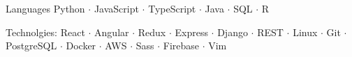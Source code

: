 


\begin{cvskills}

\cvskill
  {Languages } %
  {Python $\cdot$ JavaScript $\cdot$ TypeScript $\cdot$ Java $\cdot$ SQL $\cdot$ R } %




\cvskill
  {Technolgies:} %
  {React $\cdot$ Angular $\cdot$ Redux $\cdot$ Express $\cdot$ Django $\cdot$ REST $\cdot$ Linux $\cdot$ Git $\cdot$ PostgreSQL $\cdot$ Docker $\cdot$ AWS $\cdot$ Sass $\cdot$ Firebase $\cdot$ Vim } %





\end{cvskills}
